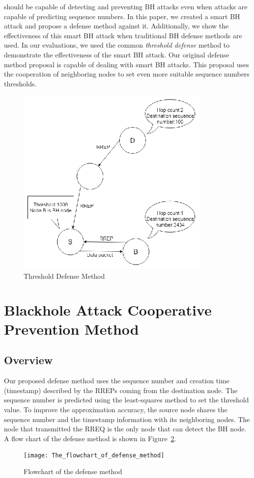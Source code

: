 \documentclass[conference]{IEEEtran}
\begin{document}
should be capable of detecting and preventing BH attacks even when attacks are capable of predicting sequence numbers.  In this paper, we created a smart BH attack and propose a defense method against it. Additionally, we show the effectiveness of this smart BH attack when traditional BH defense methods are used. In our evaluations, we used the common \textit{threshold defense} method to demonstrate the effectiveness of the smart BH attack. Our original defense method proposal is capable of dealing with smart BH attacks. This proposal uses the cooperation of neighboring nodes to set even more suitable sequence numbers thresholds. 
 
\begin{figure}[!htb]
\centering
\includegraphics[scale=1.6]{Threshold_Defense_Method}
\caption{Threshold Defense Method}
\label{fig:ThresholdDefense}
\end{figure} 
\section{Blackhole Attack Cooperative Prevention Method}
\label{blackholeCoop}


\subsection{Overview}
Our proposed defense method uses the sequence number and creation time (timestamp) described by the RREPs coming from the destination node. The sequence number is predicted using the least-squares method to set the threshold value. To improve the approximation accuracy, the source node shares the sequence number and the timestamp information with its neighboring nodes. The node that transmitted the RREQ is the only node that can detect the BH node. A flow chart of the defense method is shown in \mbox{Figure \ref{fig:FlowchartDefense}}.
\begin{figure}[!htb]
\centering
\texttt{[image: The\_flowchart\_of\_defense\_method]}
\caption{Flowchart of the defense method}
\label{fig:FlowchartDefense}
\end{figure}
\end{document}
